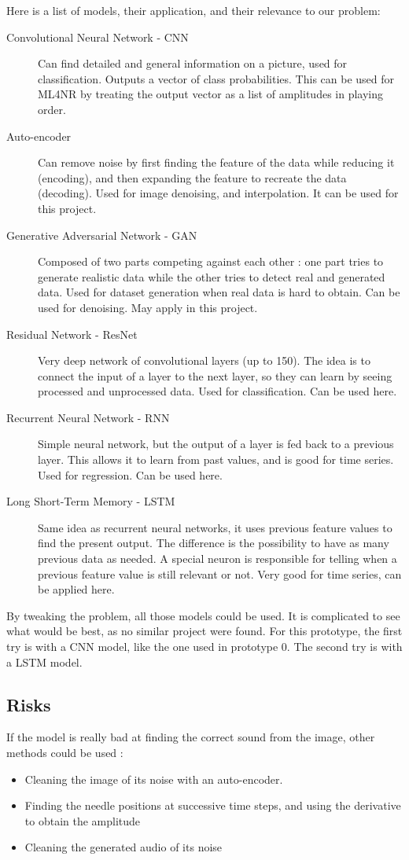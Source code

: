 \documentclass[12pt, twoside]{article}
\begin{document}
Here is a list of models, their application, and their relevance to our problem:
\begin{description}
	\item[Convolutional Neural Network - CNN] Can find detailed and general information on a picture, used for classification. Outputs a vector of class probabilities. This can be used for ML4NR by treating the output vector as a list of amplitudes in playing order.
	\item[Auto-encoder] Can remove noise by first finding the feature of the data while reducing it (encoding), and then expanding the feature to recreate the data (decoding). Used for image denoising, and interpolation. It can be used for this project.
	\item[Generative Adversarial Network - GAN] Composed of two parts competing against each other : one part tries to generate realistic data while the other tries to detect real and generated data. Used for dataset generation when real data is hard to obtain. Can be used for denoising. May apply in this project.
	\item[Residual Network - ResNet] Very deep network of convolutional layers (up to 150). The idea is to connect the input of a layer to the next layer, so they can learn by seeing processed and unprocessed data. Used for classification. Can be used here.
	\item[Recurrent Neural Network - RNN] Simple neural network, but the output of a layer is fed back to a previous layer. This allows it to learn from past values, and is good for time series. Used for regression. Can be used here.
	\item[Long Short-Term Memory - LSTM] Same idea as recurrent neural networks, it uses previous feature values to find the present output. The difference is the possibility to have as many previous data as needed. A special neuron is responsible for telling when a previous feature value is still relevant or not. Very good for time series, can be applied here.   
\end{description}
By tweaking the problem, all those models could be used. It is complicated to see what would be best, as no similar project were found. For this prototype, the first try is with a CNN model, like the one used in prototype 0. The second try is with a LSTM model.

\subsection{Risks}
If the model is really bad at finding the correct sound from the image, other methods could be used :
\begin{itemize}
\item Cleaning the image of its noise with an auto-encoder.
\item Finding the needle positions at successive time steps, and using the derivative to obtain the amplitude
\item Cleaning the generated audio of its noise
\end{itemize}
\end{document}
